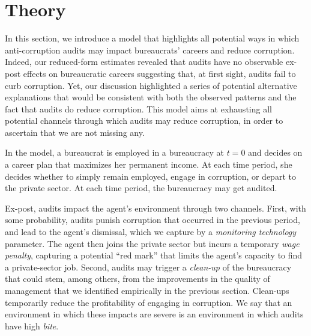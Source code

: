 \section{Theory}
\label{sec:theory}

In this section, we introduce a model that highlights all potential ways in which anti-corruption audits may impact bureaucrats' careers and reduce corruption. Indeed, our reduced-form estimates revealed that audits have no observable ex-post effects on bureaucratic careers suggesting that, at first sight, audits fail to curb corruption. Yet, our discussion highlighted a series of potential alternative explanations that would be consistent with both the observed patterns and the fact that audits do reduce corruption. This model aims at exhausting all potential channels through which audits may reduce corruption, in order to ascertain that we are not missing any. 

In the model, a bureaucrat is employed in a bureaucracy at $t = 0$ and decides on a career plan that maximizes her permanent income. At each time period, she decides whether to simply remain employed, engage in corruption, or depart to the private sector. At each time period, the bureaucracy may get audited. 

Ex-post, audits impact the agent's environment through two channels. First, with some probability, audits punish corruption that occurred in the previous period, and lead to the agent's dismissal, which we capture by a \emph{monitoring technology} parameter. The agent then joins the private sector but incurs a temporary \emph{wage penalty}, capturing a potential ``red mark'' that limits the agent's capacity to find a private-sector job. Second, audits may trigger a \emph{clean-up} of the bureaucracy that could stem, among others, from the improvements in the quality of management that we identified empirically in the previous section. Clean-ups temporarily reduce the profitability of engaging in corruption. We say that an environment in which these impacts are severe is an environment in which audits have high \emph{bite}. 

